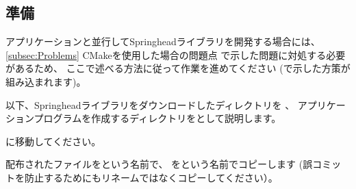 \subsection{準備}
\label{subsec:PrepareApplication}

\noindent
アプリケーションと並行してSpringheadライブラリを開発する場合には、
\UpKQs \ref{subsec:Problems} CMakeを使用した場合の問題点\UpKQe
で示した問題に対処する必要があるため、
ここで述べる方法に従って作業を進めてください
(で示した方策が組み込まれます)。

\medskip
以下、Springheadライブラリをダウンロードしたディレクトリを\SprTop{} 、
アプリケーションプログラムを作成するディレクトリを\AppTop{}として説明します。

\bigskip
\noindent
\AppTop{}に移動してください。

\bigskip
\noindent
配布されたファイルを\CMakeTopdir{}という名前で、
を\CMakeLists{}という名前でコピーします
(誤コミットを防止するためにもリネームではなくコピーしてください）。

\medskip
\begin{narrow}[s][15pt]
\end{narrow}

